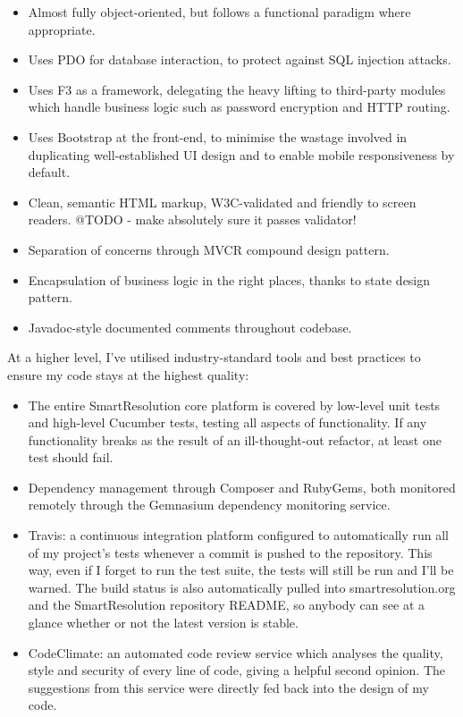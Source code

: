 \begin{itemize}
\item Almost fully object-oriented, but follows a functional paradigm where appropriate.
\item Uses PDO for database interaction, to protect against SQL injection attacks.
\item Uses F3 as a framework, delegating the heavy lifting to third-party modules which handle business logic such as password encryption and HTTP routing.
\item Uses Bootstrap at the front-end, to minimise the wastage involved in duplicating well-established UI design and to enable mobile responsiveness by default.
\item Clean, semantic HTML markup, W3C-validated and friendly to screen readers. @TODO - make absolutely sure it passes validator!
\item Separation of concerns through MVCR compound design pattern.
\item Encapsulation of business logic in the right places, thanks to state design pattern.
\item Javadoc-style documented comments throughout codebase.
\end{itemize}

At a higher level, I've utilised industry-standard tools and best practices to ensure my code stays at the highest quality:

\begin{itemize}
\item The entire SmartResolution core platform is covered by low-level unit tests and high-level Cucumber tests, testing all aspects of functionality. If any functionality breaks as the result of an ill-thought-out refactor, at least one test should fail.
\item Dependency management through Composer and RubyGems, both monitored remotely through the Gemnasium dependency monitoring service.
\item Travis: a continuous integration platform configured to automatically run all of my project's tests whenever a commit is pushed to the repository. This way, even if I forget to run the test suite, the tests will still be run and I'll be warned. The build status is also automatically pulled into smartresolution.org and the SmartResolution repository README, so anybody can see at a glance whether or not the latest version is stable.
\item CodeClimate: an automated code review service which analyses the quality, style and security of every line of code, giving a helpful second opinion. The suggestions from this service were directly fed back into the design of my code.
\end{itemize}

